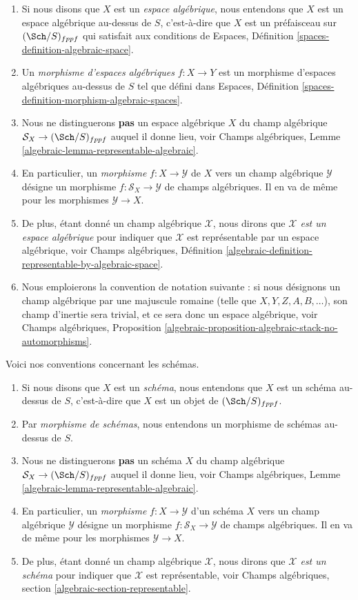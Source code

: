 \begin{enumerate}
\item Si nous disons que $X$ est un {\it espace algébrique}, nous entendons que
$X$ est un espace algébrique au-dessus de $S$, c'est-à-dire que $X$ est un préfaisceau sur
$(\Sch/S)_{fppf}$ qui satisfait aux conditions de
Espaces, Définition \ref{spaces-definition-algebraic-space}.
\item Un {\it morphisme d'espaces algébriques} $f :X \to Y$ est un morphisme
d'espaces algébriques au-dessus de $S$ tel que défini dans
Espaces, Définition \ref{spaces-definition-morphism-algebraic-spaces}.
\item Nous ne distinguerons {\bf pas} un espace algébrique $X$
du champ algébrique $\mathcal{S}_X \to (\Sch/S)_{fppf}$
auquel il donne lieu, voir
Champs algébriques, Lemme \ref{algebraic-lemma-representable-algebraic}.
\item En particulier, un {\it morphisme} $f : X \to \mathcal{Y}$ de $X$
vers un champ algébrique $\mathcal{Y}$ désigne un morphisme
$f : \mathcal{S}_X \to \mathcal{Y}$ de champs algébriques.
Il en va de même pour les morphismes $\mathcal{Y} \to X$.
\item De plus, étant donné un champ algébrique $\mathcal{X}$, nous dirons que
{\it $\mathcal{X}$ est un espace algébrique} pour indiquer que $\mathcal{X}$
est représentable par un espace algébrique, voir
Champs algébriques,
Définition \ref{algebraic-definition-representable-by-algebraic-space}.
\item Nous emploierons la convention de notation suivante : si nous
désignons un champ algébrique par une majuscule romaine
(telle que $X, Y, Z, A, B, \ldots$), son
champ d'inertie sera trivial, et ce sera donc un espace algébrique, voir
Champs algébriques,
Proposition \ref{algebraic-proposition-algebraic-stack-no-automorphisms}.
\end{enumerate}
Voici nos conventions concernant les schémas.
\begin{enumerate}
\item Si nous disons que $X$ est un {\it schéma}, nous entendons que
$X$ est un schéma au-dessus de $S$, c'est-à-dire que $X$ est un objet de $(\Sch/S)_{fppf}$.
\item Par {\it morphisme de schémas}, nous entendons un morphisme de schémas au-dessus de $S$.
\item Nous ne distinguerons {\bf pas} un schéma $X$ du
champ algébrique $\mathcal{S}_X \to (\Sch/S)_{fppf}$ auquel il donne lieu,
voir
Champs algébriques, Lemme \ref{algebraic-lemma-representable-algebraic}.
\item En particulier, un {\it morphisme} $f : X \to \mathcal{Y}$ d'un
schéma $X$ vers un champ algébrique $\mathcal{Y}$ désigne un morphisme
$f : \mathcal{S}_X \to \mathcal{Y}$ de champs algébriques.
Il en va de même pour les morphismes $\mathcal{Y} \to X$.
\item De plus, étant donné un champ algébrique $\mathcal{X}$, nous dirons que
{\it $\mathcal{X}$ est un schéma} pour indiquer que $\mathcal{X}$
est représentable, voir
Champs algébriques, section \ref{algebraic-section-representable}.
\end{enumerate}
